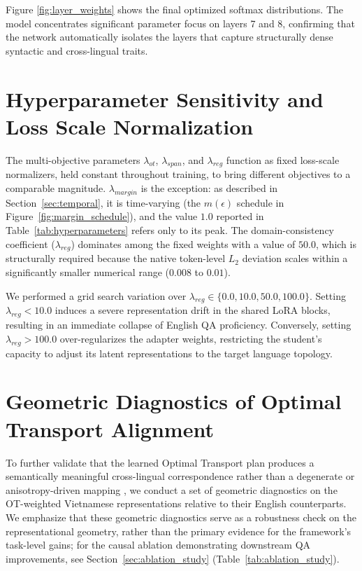 \documentclass[11pt]{article}
\begin{document}
Figure \ref{fig:layer_weights} shows the final optimized softmax distributions. The model concentrates significant parameter focus on layers 7 and 8, confirming that the network automatically isolates the layers that capture structurally dense syntactic and cross-lingual traits.

\section{Hyperparameter Sensitivity and Loss Scale Normalization}
\label{sec:appendix_sensitivity}
The multi-objective parameters $\lambda_{ot}$, $\lambda_{span}$, and $\lambda_{reg}$ function as fixed loss-scale normalizers, held constant throughout training, to bring different objectives to a comparable magnitude. $\lambda_{margin}$ is the exception: as described in Section~\ref{sec:temporal}, it is time-varying (the $m(\epsilon)$ schedule in Figure~\ref{fig:margin_schedule}), and the value $1.0$ reported in Table~\ref{tab:hyperparameters} refers only to its peak. The domain-consistency coefficient ($\lambda_{reg}$) dominates among the fixed weights with a value of $50.0$, which is structurally required because the native token-level $L_2$ deviation scales within a significantly smaller numerical range ($0.008$ to $0.01$). 

We performed a grid search variation over $\lambda_{reg} \in \{0.0, 10.0, 50.0, 100.0\}$. Setting $\lambda_{reg} < 10.0$ induces a severe representation drift in the shared LoRA blocks, resulting in an immediate collapse of English QA proficiency. Conversely, setting $\lambda_{reg} > 100.0$ over-regularizes the adapter weights, restricting the student's capacity to adjust its latent representations to the target language topology.

\section{Geometric Diagnostics of Optimal Transport Alignment}
\label{sec:appendix_diagnostics}
To further validate that the learned Optimal Transport plan produces a semantically meaningful cross-lingual correspondence rather than a degenerate or anisotropy-driven mapping \citep{ethayarajh-2019-contextual}, we conduct a set of geometric diagnostics on the OT-weighted Vietnamese representations relative to their English counterparts. We emphasize that these geometric diagnostics serve as a robustness check on the representational geometry, rather than the primary evidence for the framework's task-level gains; for the causal ablation demonstrating downstream QA improvements, see Section~\ref{sec:ablation_study} (Table~\ref{tab:ablation_study}).
\end{document}

